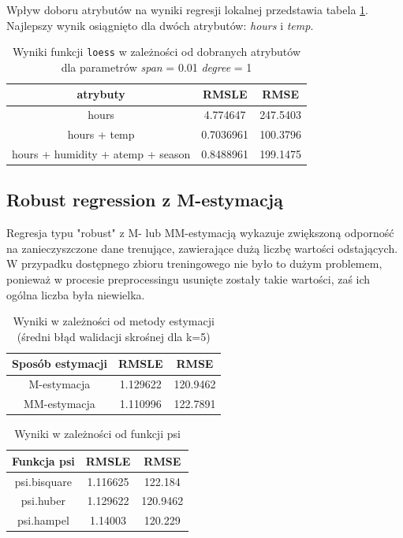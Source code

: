 \documentclass[a4paper,12pt]{article}
\begin{document}
        Wpływ doboru atrybutów na wyniki regresji lokalnej przedstawia tabela \ref{tab:loessAttr}. Najlepszy wynik osiągnięto dla dwóch atrybutów: \textit{hours} i \textit{temp}.
        
        \begin{table}
        	\centering
            \begin{tabular}{|c|c|c|}
                \hline 
                atrybuty & RMSLE & RMSE \\ 
                \hline 
                hours & 4.774647 & 247.5403 \\ 
                \hline 
                hours + temp & 0.7036961 & 100.3796 \\ 
                \hline 
                hours + humidity + atemp + season & 0.8488961 & 199.1475 \\ 
                \hline 
            \end{tabular}
            \caption{Wyniki funkcji \texttt{loess} w zależności od dobranych atrybutów dla parametrów \textit{span} = 0.01 \textit{degree} = 1}
            \label{tab:loessAttr}
        \end{table}
        
   \subsection{Robust regression z M-estymacją}
   
   Regresja typu "robust" z M- lub MM-estymacją wykazuje zwiększoną odporność na zanieczyszczone dane trenujące, zawierające dużą liczbę wartości odstających. W przypadku 
   dostępnego zbioru treningowego nie było to dużym problemem, ponieważ w procesie preprocessingu usunięte zostały takie wartości, zaś ich ogólna liczba była niewielka.
   
    \begin{table}
    \centering  
   \begin{tabular}{|c|c|c|}
   \hline
   Sposób estymacji & RMSLE & RMSE \\
   \hline
   M-estymacja & 1.129622 & 120.9462 \\
   \hline
   MM-estymacja & 1.110996 & 122.7891 \\
   \hline
   \end{tabular}
   \caption{Wyniki w zależności od metody estymacji (średni błąd walidacji skrośnej dla k=5)}
    \end{table}
    \begin{table}
    	\centering
            \begin{tabular}{|c|c|c|}
                \hline
                Funkcja psi & RMSLE & RMSE \\
                \hline
                psi.bisquare & 1.116625 & 122.184 \\
                \hline
                psi.huber & 1.129622 & 120.9462 \\
                \hline
                psi.hampel & 1.14003 & 120.229 \\
                \hline
            \end{tabular}
            \caption{Wyniki w zależności od funkcji psi}    
    \end{table}
    
\end{document}
